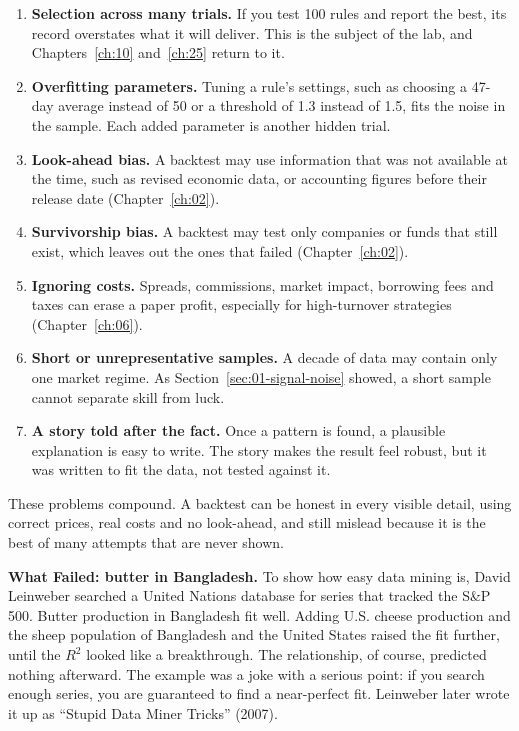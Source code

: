 \begin{enumerate}
  \item \textbf{Selection across many trials.} If you test 100 rules and report the best, its record overstates what it will deliver. This is the subject of the lab, and Chapters~\ref{ch:10} and~\ref{ch:25} return to it.
  \item \textbf{Overfitting parameters.} Tuning a rule's settings, such as choosing a 47-day average instead of 50 or a threshold of 1.3 instead of 1.5, fits the noise in the sample. Each added parameter is another hidden trial.
  \item \textbf{Look-ahead bias.} A backtest may use information that was not available at the time, such as revised economic data, or accounting figures before their release date (Chapter~\ref{ch:02}).
  \item \textbf{Survivorship bias.} A backtest may test only companies or funds that still exist, which leaves out the ones that failed (Chapter~\ref{ch:02}).
  \item \textbf{Ignoring costs.} Spreads, commissions, market impact, borrowing fees and taxes can erase a paper profit, especially for high-turnover strategies (Chapter~\ref{ch:06}).
  \item \textbf{Short or unrepresentative samples.} A decade of data may contain only one market regime. As Section~\ref{sec:01-signal-noise} showed, a short sample cannot separate skill from luck.
  \item \textbf{A story told after the fact.} Once a pattern is found, a plausible explanation is easy to write. The story makes the result feel robust, but it was written to fit the data, not tested against it.
\end{enumerate}

These problems compound. A backtest can be honest in every visible detail, using correct prices, real costs and no look-ahead, and still mislead because it is the best of many attempts that are never shown.

\begin{callout}
\textbf{What Failed: butter in Bangladesh.} To show how easy data mining is, David Leinweber searched a United Nations database for series that tracked the S\&P 500. Butter production in Bangladesh fit well. Adding U.S. cheese production and the sheep population of Bangladesh and the United States raised the fit further, until the $R^2$ looked like a breakthrough. The relationship, of course, predicted nothing afterward. The example was a joke with a serious point: if you search enough series, you are guaranteed to find a near-perfect fit. Leinweber later wrote it up as ``Stupid Data Miner Tricks'' (2007).
\end{callout}

